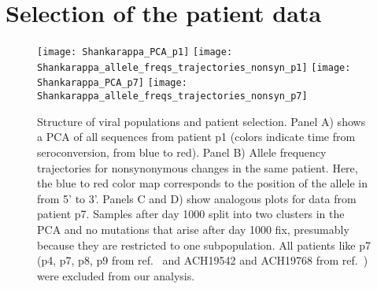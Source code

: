 

\makeatletter 
\renewcommand{\thefigure}{S\@arabic\c@figure}
\makeatother

\section{Selection of the patient data}
\begin{figure}[ht]
\begin{center}
\texttt{[image: Shankarappa\_PCA\_p1]}
\texttt{[image: Shankarappa\_allele\_freqs\_trajectories\_nonsyn\_p1]}
\texttt{[image: Shankarappa\_PCA\_p7]}
\texttt{[image: Shankarappa\_allele\_freqs\_trajectories\_nonsyn\_p7]}
\caption{Structure of viral populations and patient selection.
Panel A) shows a PCA of all sequences from patient p1 (colors indicate time from
seroconversion, from blue to red). Panel B) Allele frequency trajectories for nonsynonymous
changes in the same patient. Here, the blue to red color map corresponds to the
position of the allele in \env{} from 5' to 3'. Panels C and D) show analogous
plots for data from patient p7. Samples after day 1000 split into two clusters in the PCA and no mutations that arise after day 1000 fix, presumably because they are restricted
to one subpopulation. All patients like p7 (p4, p7, p8, p9 from ref.~\citealp{shankarappa_consistent_1999} and
ACH19542 and ACH19768 from ref.~\citealp{bunnik_autologous_2008}) were excluded
from our analysis.}
\label{fig:aftp}
\end{center}
\end{figure}

\newpage
